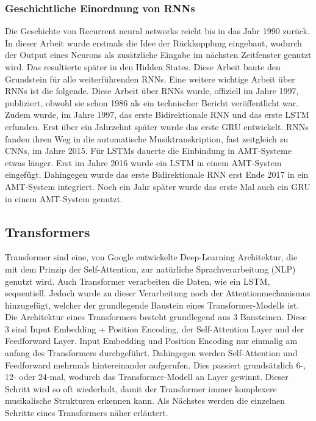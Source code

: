 \subsubsection{Geschichtliche Einordnung von RNNs}
Die Geschichte von Recurrent neural networks reicht bis in das Jahr 1990 zurück\cite{elman1990finding}.
In dieser Arbeit wurde erstmals die Idee der Rückkopplung eingebaut,
wodurch der Output eines Neurons als zusätzliche Eingabe im nächsten Zeitfenster genutzt wird.
Das resultierte später in den Hidden States.
Diese Arbeit baute den Grundstein für alle weiterführenden RNNs.
Eine weitere wichtige Arbeit über RNNs ist die folgende\cite{jordan1997serial}.
Diese Arbeit über RNNs wurde, offiziell im Jahre 1997, publiziert,
obwohl sie schon 1986 als ein technischer Bericht veröffentlicht war.
Zudem wurde, im Jahre 1997, das erste Bidirektionale RNN\cite{schuster1997bidirectional}
und das erste LSTM erfunden\cite{hochreiter1997long}.
Erst über ein Jahrzehnt später wurde das erste GRU entwickelt\cite{chung2014empirical}.
RNNs fanden ihren Weg in die automatische Musiktranskription, fast zeitgleich zu CNNs, im Jahre 2015\cite{sigtia2015hybrid}.
Für LSTMs dauerte die Einbindung in AMT-Systeme etwas länger.
Erst im Jahre 2016 wurde ein LSTM in einem AMT-System eingefügt\cite{sigtia2016end}.
Dahingegen wurde das erste Bidirektionale RNN erst Ende 2017 in ein AMT-System integriert\cite{hawthorne2017onsets}.
Noch ein Jahr später wurde das erste Mal auch ein GRU in einem AMT-System genutzt\cite{jung2018adaptive}.

\subsection{Transformers}
Transformer sind eine, von Google entwickelte Deep-Learning Architektur,
die mit dem Prinzip der Self-Attention, zur natürliche Sprachverarbeitung (NLP) genutzt wird.
Auch Transformer verarbeiten die Daten, wie ein LSTM, sequentiell.
Jedoch wurde zu dieser Verarbeitung noch der Attentionmechanismus hinzugefügt,
welcher der grundlegende Baustein eines Transformer-Modells ist.
Die Architektur eines Transformers besteht grundlegend aus 3 Bausteinen.
Diese 3 sind Input Embedding + Position Encoding, der Self-Attention Layer und der Feedforward Layer.
Input Embedding und Position Encoding nur einmalig am anfang des Transformers durchgeführt.
Dahingegen werden Self-Attention und Feedforward mehrmals hintereinander aufgerufen.
Dies passiert grundsätzlich 6-, 12- oder 24-mal, wodurch das Transformer-Modell an Layer gewinnt.
Dieser Schritt wird so oft wiederholt, damit der Transformer immer komplexere musikalische Strukturen erkennen kann.
Als Nächstes werden die einzelnen Schritte eines Transformers näher erläutert.

